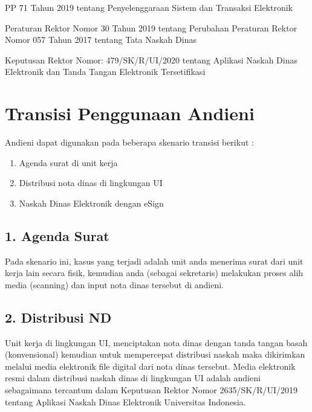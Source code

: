 \documentclass[letterpaper,10pt,bahasai]{sphinxmanual}
\begin{document}
\begin{DUlineblock}{0em}
\item[]  PP 71 Tahun 2019 tentang Penyelenggaraan Sistem dan Transaksi Elektronik
\item[]  Peraturan Rektor Nomor 30 Tahun 2019 tentang Perubahan Peraturan Rektor Nomor 057 Tahun 2017 tentang Tata Naskah Dinas
\item[]  Keputusan Rektor Nomor: 479/SK/R/UI/2020 tentang Aplikasi Naskah Dinas Elektronik dan Tanda Tangan Elektronik Tersetifikasi
\end{DUlineblock}


\chapter{Transisi Penggunaan Andieni}
\label{\detokenize{interface:transisi-penggunaan-andieni}}\label{\detokenize{interface::doc}}
Andieni dapat digunakan pada beberapa skenario transisi berikut :
\begin{enumerate}
%
\item {} 
Agenda surat di unit kerja

\item {} 
Distribusi nota dinas di lingkungan UI

\item {} 
Naskah Dinas Elektronik dengan eSign

\end{enumerate}


\section{1. Agenda Surat}
\label{\detokenize{interface:agenda-surat}}
Pada skenario ini, kasus yang terjadi adalah unit anda menerima surat dari unit kerja lain secara fisik, kemudian anda
(sebagai sekretaris) melakukan proses alih media (scanning) dan input nota dinas tersebut di andieni.

\noindent{}


\section{2. Distribusi ND}
\label{\detokenize{interface:distribusi-nd}}
Unit kerja di lingkungan UI, menciptakan nota dinas dengan tanda tangan basah (konvensional) kemudian untuk mempercepat
distribusi naskah maka dikirimkan melalui media elektronik file digital dari nota dinas tersebut. Media elektronik
resmi dalam distribusi naskah dinas di lingkungan UI adalah andieni sebagaimana tercantum dalam Keputusan Rektor Nomor
2635/SK/R/UI/2019 tentang Aplikasi Naskah Dinas Elektronik Universitas Indonesia.
\end{document}
